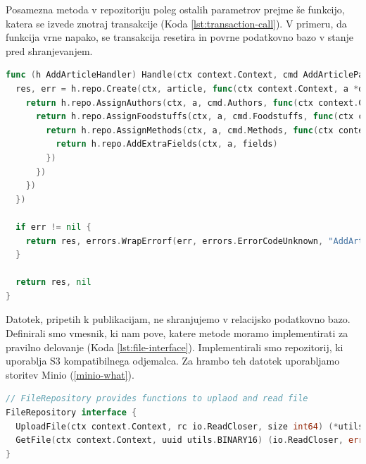 \documentclass[a4paper, 12pt]{book}
\begin{document}
Posamezna metoda v repozitoriju poleg ostalih parametrov prejme še funkcijo, katera se izvede znotraj transakcije (Koda \ref{lst:transaction-call}). V primeru, da funkcija vrne napako, se transakcija resetira in povrne podatkovno bazo v stanje pred shranjevanjem.

\begin{lstlisting}[language=go,style=mystyle,caption={ Prikaz shranjevanja publikacije. },label=lst:transaction-call]
func (h AddArticleHandler) Handle(ctx context.Context, cmd AddArticleParamsCmd) (res *domain.Article, err error) {
  res, err = h.repo.Create(ctx, article, func(ctx context.Context, a *domain.Article) error {
    return h.repo.AssignAuthors(ctx, a, cmd.Authors, func(ctx context.Context, a *domain.Article) error {
      return h.repo.AssignFoodstuffs(ctx, a, cmd.Foodstuffs, func(ctx context.Context, a *domain.Article) error {
        return h.repo.AssignMethods(ctx, a, cmd.Methods, func(ctx context.Context, a *domain.Article) error {
          return h.repo.AddExtraFields(ctx, a, fields)
        })
      })
    })
  })

  if err != nil {
    return res, errors.WrapErrorf(err, errors.ErrorCodeUnknown, "AddArticleHandler.repo")
  }

  return res, nil
}
\end{lstlisting}

Datotek, pripetih k publikacijam, ne shranjujemo v relacijsko podatkovno bazo. Definirali smo vmesnik, ki nam pove, katere metode moramo implementirati za pravilno delovanje (Koda \ref{lst:file-interface}). Implementirali smo repozitorij, ki uporablja S3 kompatibilnega odjemalca. Za hrambo teh datotek uporabljamo storitev Minio (\ref{minio-what}).

\begin{lstlisting}[language=go,style=mystyle,caption={Prikaz vmesnika za shranjevanje in branje datotek.},label=lst:file-interface]
// FileRepository provides functions to uplaod and read file
FileRepository interface {
  UploadFile(ctx context.Context, rc io.ReadCloser, size int64) (*utils.BINARY16, error)
  GetFile(ctx context.Context, uuid utils.BINARY16) (io.ReadCloser, error)
}
\end{lstlisting}
\end{document}
